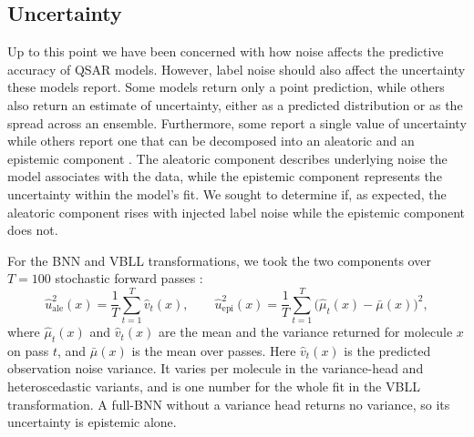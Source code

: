 \subsection{Uncertainty}

Up to this point we have been concerned with how noise affects the predictive accuracy of QSAR models. However, label noise should also affect the uncertainty these models report. Some models return only a point prediction, while others also return an estimate of uncertainty, either as a predicted distribution or as the spread across an ensemble. Furthermore, some report a single value of uncertainty while others report one that can be decomposed into an aleatoric and an epistemic component \citep{kendall2017}. The aleatoric component describes underlying noise the model associates with the data, while the epistemic component represents the uncertainty within the model's fit. We sought to determine if, as expected, the aleatoric component rises with injected label noise while the epistemic component does not.

For the BNN and VBLL transformations, we took the two components over $T = 100$ stochastic forward
passes \citep{kendall2017}:
\begin{equation}
\hat{u}^2_{\text{ale}}(x) = \frac{1}{T}\sum_{t=1}^{T}\hat{v}_t(x),
\qquad
\hat{u}^2_{\text{epi}}(x) = \frac{1}{T}\sum_{t=1}^{T}\big(\hat{\mu}_t(x) - \bar{\mu}(x)\big)^2 ,
\label{eq:sampling_split}
\end{equation}
where $\hat{\mu}_t(x)$ and $\hat{v}_t(x)$ are the mean and the variance returned for molecule $x$ on
pass $t$, and $\bar{\mu}(x)$ is the mean over passes. Here $\hat{v}_t(x)$ is the predicted observation
noise variance. It varies per molecule in the variance-head and heteroscedastic variants, and is one
number for the whole fit in the VBLL transformation. A full-BNN without a variance head returns no
variance, so its uncertainty is epistemic alone.


